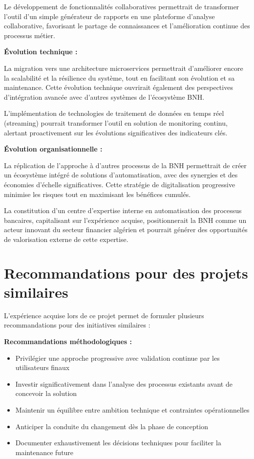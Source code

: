 \medskip

Le développement de fonctionnalités collaboratives permettrait de transformer l'outil d'un simple générateur de rapports en une plateforme d'analyse collaborative, favorisant le partage de connaissances et l'amélioration continue des processus métier.

\medskip

\textbf{Évolution technique :}

La migration vers une architecture microservices permettrait d'améliorer encore la scalabilité et la résilience du système, tout en facilitant son évolution et sa maintenance. Cette évolution technique ouvrirait également des perspectives d'intégration avancée avec d'autres systèmes de l'écosystème BNH.

\medskip

L'implémentation de technologies de traitement de données en temps réel (streaming) pourrait transformer l'outil en solution de monitoring continu, alertant proactivement sur les évolutions significatives des indicateurs clés.

\medskip

\textbf{Évolution organisationnelle :}

La réplication de l'approche à d'autres processus de la BNH permettrait de créer un écosystème intégré de solutions d'automatisation, avec des synergies et des économies d'échelle significatives. Cette stratégie de digitalisation progressive minimise les risques tout en maximisant les bénéfices cumulés.

\medskip

La constitution d'un centre d'expertise interne en automatisation des processus bancaires, capitalisant sur l'expérience acquise, positionnerait la BNH comme un acteur innovant du secteur financier algérien et pourrait générer des opportunités de valorisation externe de cette expertise.

\section*{Recommandations pour des projets similaires}

L'expérience acquise lors de ce projet permet de formuler plusieurs recommandations pour des initiatives similaires :

\medskip

\textbf{Recommandations méthodologiques :}

\begin{itemize}
    \item Privilégier une approche progressive avec validation continue par les utilisateurs finaux
    \item Investir significativement dans l'analyse des processus existants avant de concevoir la solution
    \item Maintenir un équilibre entre ambition technique et contraintes opérationnelles
    \item Anticiper la conduite du changement dès la phase de conception
    \item Documenter exhaustivement les décisions techniques pour faciliter la maintenance future
\end{itemize}

